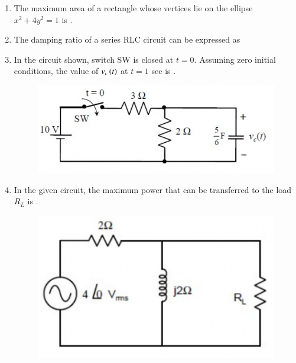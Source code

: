 \documentclass[a4paper, 11pt]{article}
\begin{document}
\begin{enumerate}
    \hfill{}

    \item The maximum area  of a rectangle whose vertices lie on the ellipse $x^{2}+4y^{2}=1$ is \underline{\hspace{2cm}}.
    
    \hfill{}

    \item The damping ratio of a series RLC circuit can be expressed as
    \begin{enumerate}
    \end{enumerate}
    
    \hfill{}

    \item In the circuit shown, switch SW is closed at $t=0$. Assuming zero initial conditions, the value of $v_{c}\left(t\right)$  at $t=1$ sec is \underline{\hspace{2cm}}.
    \begin{figure}[H]
        \centering
        \includegraphics[width=0.5\columnwidth]{figs/q41.png}
        \caption*{}
        \label{fig:q41}
    \end{figure}
    
    \hfill{}

    \item In the given circuit, the maximum power  that can be transferred to the load $R_{L}$ is \underline{\hspace{2cm}}.
    \begin{figure}[H]
        \centering
        \includegraphics[width=0.5\columnwidth]{figs/q42.png}
        \caption*{}
        \label{fig:q42}
    \end{figure}
    

\end{enumerate}
\end{document}
